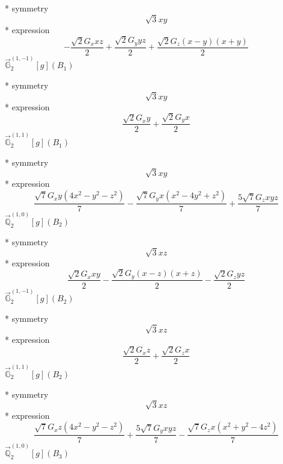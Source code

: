 \documentclass[fleqn,8pt]{jsarticle}
\begin{document}
\noindent\quad ** symmetry
\begin{dmath*}
\sqrt{3} x y
\end{dmath*}
\noindent\quad ** expression
\begin{dmath*}
- \frac{\sqrt{2} G_{x} x z}{2} + \frac{\sqrt{2} G_{y} y z}{2} + \frac{\sqrt{2} G_{z} \left(x - y\right) \left(x + y\right)}{2}
\end{dmath*}
\noindent\quad $\vec{\mathbb{G}}_{2}^{(1,-1)}[g](B_{1})$

\noindent\quad ** symmetry
\begin{dmath*}
\sqrt{3} x y
\end{dmath*}
\noindent\quad ** expression
\begin{dmath*}
\frac{\sqrt{2} G_{x} y}{2} + \frac{\sqrt{2} G_{y} x}{2}
\end{dmath*}
\noindent\quad $\vec{\mathbb{G}}_{2}^{(1,1)}[g](B_{1})$

\noindent\quad ** symmetry
\begin{dmath*}
\sqrt{3} x y
\end{dmath*}
\noindent\quad ** expression
\begin{dmath*}
\frac{\sqrt{7} G_{x} y \left(4 x^{2} - y^{2} - z^{2}\right)}{7} - \frac{\sqrt{7} G_{y} x \left(x^{2} - 4 y^{2} + z^{2}\right)}{7} + \frac{5 \sqrt{7} G_{z} x y z}{7}
\end{dmath*}
\noindent\quad $\vec{\mathbb{Q}}_{2}^{(1,0)}[g](B_{2})$

\noindent\quad ** symmetry
\begin{dmath*}
\sqrt{3} x z
\end{dmath*}
\noindent\quad ** expression
\begin{dmath*}
\frac{\sqrt{2} G_{x} x y}{2} - \frac{\sqrt{2} G_{y} \left(x - z\right) \left(x + z\right)}{2} - \frac{\sqrt{2} G_{z} y z}{2}
\end{dmath*}
\noindent\quad $\vec{\mathbb{G}}_{2}^{(1,-1)}[g](B_{2})$

\noindent\quad ** symmetry
\begin{dmath*}
\sqrt{3} x z
\end{dmath*}
\noindent\quad ** expression
\begin{dmath*}
\frac{\sqrt{2} G_{x} z}{2} + \frac{\sqrt{2} G_{z} x}{2}
\end{dmath*}
\noindent\quad $\vec{\mathbb{G}}_{2}^{(1,1)}[g](B_{2})$

\noindent\quad ** symmetry
\begin{dmath*}
\sqrt{3} x z
\end{dmath*}
\noindent\quad ** expression
\begin{dmath*}
\frac{\sqrt{7} G_{x} z \left(4 x^{2} - y^{2} - z^{2}\right)}{7} + \frac{5 \sqrt{7} G_{y} x y z}{7} - \frac{\sqrt{7} G_{z} x \left(x^{2} + y^{2} - 4 z^{2}\right)}{7}
\end{dmath*}
\noindent\quad $\vec{\mathbb{Q}}_{2}^{(1,0)}[g](B_{3})$
\end{document}
